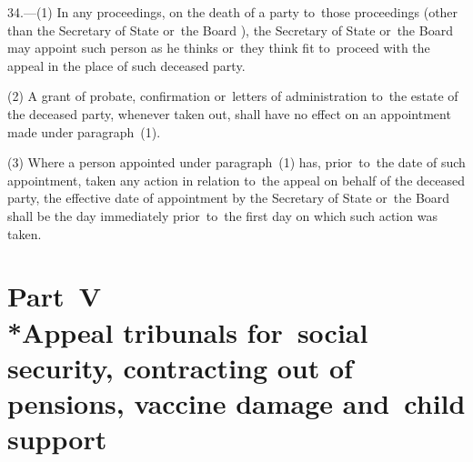 \documentclass[12pt,a4paper]{article}
\begin{document}
34.—(1) In any proceedings, on the death of a party to~those proceedings (other than the Secretary of State
or~the Board%
), the Secretary of State 
or~the Board   %
may appoint such person as he thinks 
or~they think   %
fit to~proceed with the appeal in the place of such deceased party.

(2) A grant of probate, confirmation or~letters of administration to~the estate of the deceased party, whenever taken out, shall have no effect on an appointment made under paragraph~(1).

(3) Where a person appointed under paragraph~(1) has, prior~to~the date of such appointment, taken any action in relation to~the appeal on behalf of the deceased party, the effective date of appointment by the Secretary of State 
or~the Board   %
shall be the day immediately prior~to~the first day on which such action was taken.


\section[Part~V --- Appeal tribunals for~social security, contracting out of pensions, vaccine damage and~child support]{Part~V\\*Appeal tribunals for~social security, contracting out of pensions, vaccine damage and~child support}

\end{document}
